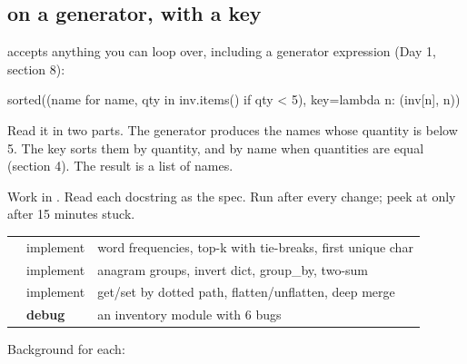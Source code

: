 \documentclass[10pt,a4paper]{article}
\begin{document}
\subsection{ on a generator, with a key}
 accepts anything you can loop over, including a generator expression (Day 1, section 8):
\begin{pycode}
sorted((name for name, qty in inv.items() if qty < 5), key=lambda n: (inv[n], n))
\end{pycode}
Read it in two parts. The generator produces the names whose quantity is below 5. The key sorts them by quantity, and by name when quantities are equal (section 4). The result is a list of names.
\begin{practicebox}
Work in . Read each docstring as the spec. Run  after every change; peek at  only after 15 minutes stuck.
\end{practicebox}
\begin{datatable}{}{\footnotesize}
\begin{xltabular}{\linewidth}{@{}Y{1.33}Y{0.58}Y{1.09}@{}}
 &  &  \\ \hline
\endhead
{} & implement & word frequencies, top-k with tie-breaks, first unique char \\
 & implement & anagram groups, invert dict, group\_by, two-sum \\
 & implement & get/set by dotted path, flatten/unflatten, deep merge \\
 & \textbf{debug} & an inventory module with 6 bugs \\
\hline
\end{xltabular}
\end{datatable}
Background for each:
\end{document}
